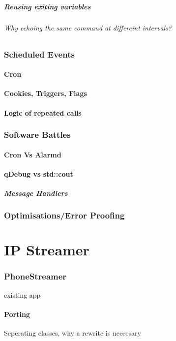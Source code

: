 \documentclass[11pt]{article} %
\begin{document}
\subsubsection{Reusing exiting variables}
\paragraph{Why echoing the same command at differeint intervals?}
\section{Scheduled Events}
\subsection{Cron}
\subsection{Cookies, Triggers, Flags}
\subsection{Logic of repeated calls}
\section{Software Battles}
\subsection{Cron Vs Alarmd}
\subsection{qDebug vs std::cout}
\subsubsection{Message Handlers}
\section{Optimisations/Error Proofing}


\part{IP Streamer}
\section{PhoneStreamer}{existing app}
\subsection{Porting}{Seperating classes, why a rewrite is neccesary}
\end{document}
